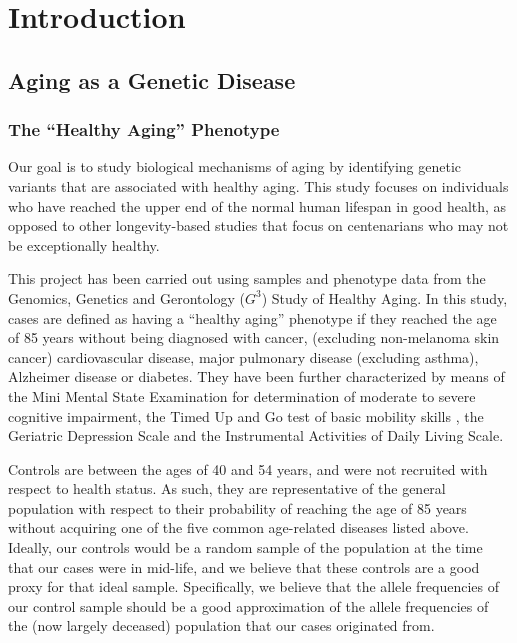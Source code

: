 \chapter{Introduction}\label{intro}

\section{Aging as a Genetic Disease}

\subsection{The ``Healthy Aging'' Phenotype}
Our goal is to study biological mechanisms of aging by identifying genetic variants that are associated with healthy aging.  This study focuses on individuals who have reached the upper end of the normal human lifespan in good health, as opposed to other longevity-based studies that focus on centenarians who may not be exceptionally healthy\cite{Costa2009,Sebastiani2012,zhang2003strikingly}.

This project has been carried out using samples and phenotype data from the Genomics, Genetics and Gerontology ($G^{3}$) Study of Healthy Aging. In this study, cases are defined as having a ``healthy aging'' phenotype if they reached the age of 85 years without being diagnosed with cancer, (excluding non-melanoma skin cancer) cardiovascular disease, major pulmonary disease (excluding asthma), Alzheimer disease or diabetes.  They have been further characterized by means of the Mini Mental State Examination for determination of moderate to severe cognitive impairment\cite{folstein1975mini}, the Timed Up and Go test of basic mobility skills\cite{podsiadlo1991timed} , the Geriatric Depression Scale\cite{yesavage1983geriatric} and the Instrumental Activities of Daily Living Scale\cite{katz1983assessing}.

Controls are between the ages of 40 and 54 years, and were not recruited with respect to health status.  As such, they are representative of the general population with respect to their probability of reaching the age of 85 years without acquiring one of the five common age-related diseases listed above.  Ideally, our controls would be a random sample of the population at the time that our cases were in mid-life, and we believe that these controls are a good proxy for that ideal sample.  Specifically, we believe that the allele frequencies of our control sample should be a good approximation of the allele frequencies of the (now largely deceased) population that our cases originated from.

